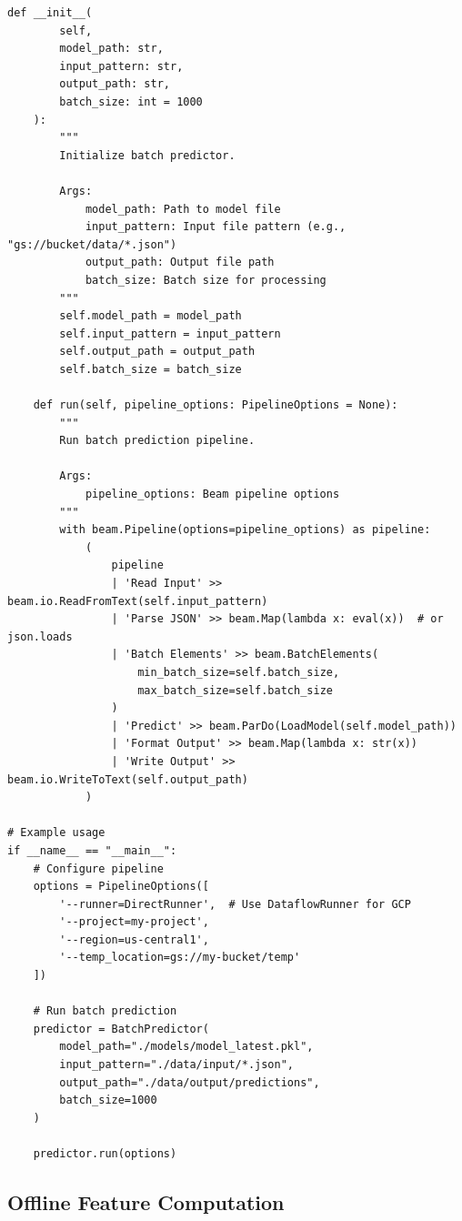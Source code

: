 \begin{lstlisting}[style=python, caption={Scalable Batch Prediction with Apache Beam}]
    def __init__(
        self,
        model_path: str,
        input_pattern: str,
        output_path: str,
        batch_size: int = 1000
    ):
        """
        Initialize batch predictor.

        Args:
            model_path: Path to model file
            input_pattern: Input file pattern (e.g., "gs://bucket/data/*.json")
            output_path: Output file path
            batch_size: Batch size for processing
        """
        self.model_path = model_path
        self.input_pattern = input_pattern
        self.output_path = output_path
        self.batch_size = batch_size

    def run(self, pipeline_options: PipelineOptions = None):
        """
        Run batch prediction pipeline.

        Args:
            pipeline_options: Beam pipeline options
        """
        with beam.Pipeline(options=pipeline_options) as pipeline:
            (
                pipeline
                | 'Read Input' >> beam.io.ReadFromText(self.input_pattern)
                | 'Parse JSON' >> beam.Map(lambda x: eval(x))  # or json.loads
                | 'Batch Elements' >> beam.BatchElements(
                    min_batch_size=self.batch_size,
                    max_batch_size=self.batch_size
                )
                | 'Predict' >> beam.ParDo(LoadModel(self.model_path))
                | 'Format Output' >> beam.Map(lambda x: str(x))
                | 'Write Output' >> beam.io.WriteToText(self.output_path)
            )

# Example usage
if __name__ == "__main__":
    # Configure pipeline
    options = PipelineOptions([
        '--runner=DirectRunner',  # Use DataflowRunner for GCP
        '--project=my-project',
        '--region=us-central1',
        '--temp_location=gs://my-bucket/temp'
    ])

    # Run batch prediction
    predictor = BatchPredictor(
        model_path="./models/model_latest.pkl",
        input_pattern="./data/input/*.json",
        output_path="./data/output/predictions",
        batch_size=1000
    )

    predictor.run(options)
\end{lstlisting}

\subsection{Offline Feature Computation}


